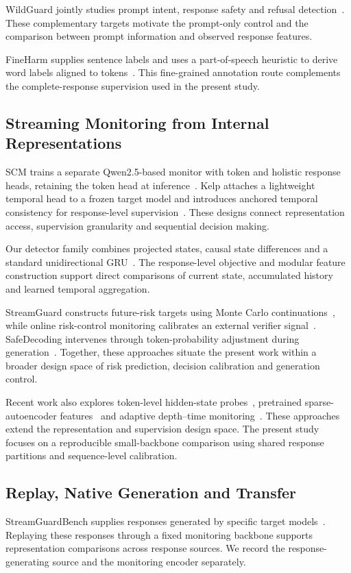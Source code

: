 WildGuard jointly studies prompt intent, response safety and refusal detection~\cite{han2024wildguard}. These complementary targets motivate the prompt-only control and the comparison between prompt information and observed response features.

FineHarm supplies sentence labels and uses a part-of-speech heuristic to derive word labels aligned to tokens~\cite{NEURIPS2025_4e315702}. This fine-grained annotation route complements the complete-response supervision used in the present study.

\subsection{Streaming Monitoring from Internal Representations}
SCM trains a separate Qwen2.5-based monitor with token and holistic response heads, retaining the token head at inference~\cite{NEURIPS2025_4e315702}. Kelp attaches a lightweight temporal head to a frozen target model and introduces anchored temporal consistency for response-level supervision~\cite{li2025kelpstreamingsafeguardlarge}. These designs connect representation access, supervision granularity and sequential decision making.

Our detector family combines projected states, causal state differences and a standard unidirectional GRU~\cite{cho2014gru}. The response-level objective and modular feature construction support direct comparisons of current state, accumulated history and learned temporal aggregation.

StreamGuard constructs future-risk targets using Monte Carlo continuations~\cite{kavumba2026streamguard}, while online risk-control monitoring calibrates an external verifier signal~\cite{schirmer2026online}. SafeDecoding intervenes through token-probability adjustment during generation~\cite{xu2024safedecoding}. Together, these approaches situate the present work within a broader design space of risk prediction, decision calibration and generation control.

Recent work also explores token-level hidden-state probes~\cite{shu2026stopearly}, pretrained sparse-autoencoder features~\cite{fang2026nextguard} and adaptive depth--time monitoring~\cite{wei2026adtguard}. These approaches extend the representation and supervision design space. The present study focuses on a reproducible small-backbone comparison using shared response partitions and sequence-level calibration.

\subsection{Replay, Native Generation and Transfer}
StreamGuardBench supplies responses generated by specific target models~\cite{li2025kelpstreamingsafeguardlarge,streamguardbench2025data}. Replaying these responses through a fixed monitoring backbone supports representation comparisons across response sources. We record the response-generating source and the monitoring encoder separately.

